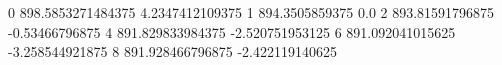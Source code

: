 0 898.5853271484375 4.2347412109375
1 894.3505859375 0.0
2 893.81591796875 -0.53466796875
4 891.829833984375 -2.520751953125
6 891.092041015625 -3.258544921875
8 891.928466796875 -2.422119140625
